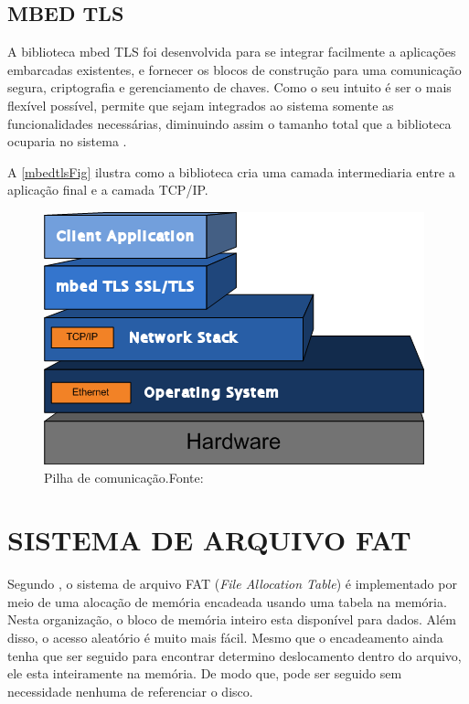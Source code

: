 \subsection{MBED TLS}
A biblioteca mbed TLS foi desenvolvida para se integrar facilmente a aplicações embarcadas existentes, e fornecer os blocos de construção para uma comunicação segura, criptografia e gerenciamento de chaves. Como o seu intuito é ser o mais flexível possível, permite que sejam integrados ao sistema somente as funcionalidades necessárias, diminuindo assim o tamanho total que a biblioteca ocuparia no sistema \cite{mbedtls}.

A \autoref{mbedtlsFig} ilustra como a biblioteca cria uma camada intermediaria entre a aplicação final e a camada TCP/IP.

\begin{figure}[H]
    \scriptsize
     \centering
     \includegraphics[scale=1]{dados/figuras/mbedtls.png}
     \caption{Pilha de comunicação.\newline Fonte:\cite{mbedtls}}
     \label{mbedtlsFig}
\end{figure}



\section{SISTEMA DE ARQUIVO FAT}

Segundo , o sistema de arquivo FAT (\textit{File Allocation Table}) é implementado por meio de uma alocação de memória encadeada usando uma tabela na memória. Nesta organização, o bloco de memória inteiro esta disponível para dados. Além disso, o acesso aleatório é muito mais fácil. Mesmo que o encadeamento ainda tenha que ser seguido para encontrar determino deslocamento dentro do arquivo, ele esta inteiramente na memória. De modo que, pode ser seguido sem necessidade nenhuma de referenciar o disco.

